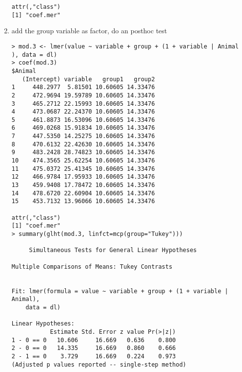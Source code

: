 \begin{frame}
\begin{enumerate}
\begin{verbatim}
attr(,"class")
[1] "coef.mer"  
\end{verbatim}
\normalsize
  \item add the group variable as factor, do an posthoc test\scriptsize
\begin{verbatim}
> mod.3 <- lmer(value ~ variable + group + (1 + variable | Animal ), data = dl)
> coef(mod.3)
$Animal
   (Intercept) variable   group1   group2
1     448.2977  5.81501 10.60605 14.33476
2     472.9694 19.59789 10.60605 14.33476
3     465.2712 22.15993 10.60605 14.33476
4     473.0687 22.24370 10.60605 14.33476
5     461.8873 16.53096 10.60605 14.33476
6     469.0268 15.91834 10.60605 14.33476
7     447.5350 14.25275 10.60605 14.33476
8     470.6132 22.42630 10.60605 14.33476
9     483.2428 28.74823 10.60605 14.33476
10    474.3565 25.62254 10.60605 14.33476
11    475.0372 25.41345 10.60605 14.33476
12    466.9784 17.95933 10.60605 14.33476
13    459.9408 17.78472 10.60605 14.33476
14    478.6720 22.60904 10.60605 14.33476
15    453.7132 13.96066 10.60605 14.33476

attr(,"class")
[1] "coef.mer"
> summary(glht(mod.3, linfct=mcp(group="Tukey")))

	 Simultaneous Tests for General Linear Hypotheses

Multiple Comparisons of Means: Tukey Contrasts


Fit: lmer(formula = value ~ variable + group + (1 + variable | Animal), 
    data = dl)

Linear Hypotheses:
           Estimate Std. Error z value Pr(>|z|)
1 - 0 == 0   10.606     16.669   0.636    0.800
2 - 0 == 0   14.335     16.669   0.860    0.666
2 - 1 == 0    3.729     16.669   0.224    0.973
(Adjusted p values reported -- single-step method)
\end{verbatim}
  \end{enumerate}
\end{frame}
